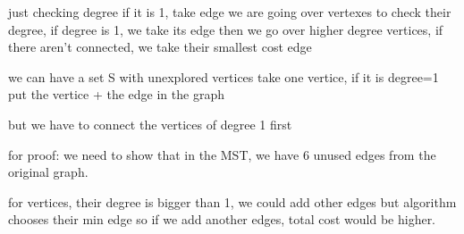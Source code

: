 just checking degree if it is 1, take edge
we are going over vertexes to check their degree, if degree is 1, we take its edge
then we go over higher degree vertices, if there aren't connected, we take their smallest cost edge

we can have a set S with unexplored vertices
take one vertice, if it is degree=1 put the vertice + the edge in the graph

but we have to connect the vertices  of degree 1 first

for proof: we need to show that in the MST, we have 6 unused edges from the original graph.

for vertices, their degree is bigger than 1, we could add other edges but algorithm chooses their min edge so if we add another edges, total cost would be higher.
